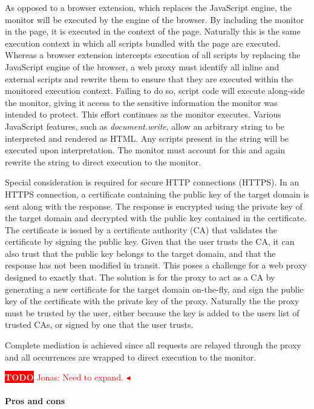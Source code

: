 \documentclass{llncs}
\newcommand{\todo}[1]{\colorbox{red}{\textcolor{white}{\sffamily\bfseries\scriptsize TODO}} \textcolor{red}{#1} \textcolor{red}{$\blacktriangleleft$}}
\begin{document}
As opposed to a browser extension, which replaces the 
JavaScript engine, the monitor will be executed by the engine of the browser. 
By including the monitor in the page, it is executed in the context of the page. Naturally 
this is the same execution context in which all scripts bundled with the 
page are executed. Whereas a 
browser extension intercepts execution of all scripts by replacing the JavaScript 
engine of the browser, a web proxy must identify all inline and 
external scripts and rewrite them to ensure that they are executed within the 
monitored execution context. Failing to do so, script code will execute 
along-side the monitor, giving it access to the sensitive information the 
monitor was intended to protect. 
This effort continues as the monitor executes. Various JavaScript features, such as 
\emph{document.write}, allow an arbitrary string to be 
interpreted and rendered as HTML. Any scripts present in the string will be 
executed upon interpretation. The monitor must account for this and again rewrite 
the string to direct execution to the monitor.

Special consideration is required for secure HTTP connections (HTTPS). In an HTTPS 
connection, a certificate containing the public key of the target domain is sent 
along with the response. The response is encrypted using the private key of the target 
domain and decrypted with the public key contained in the certificate. The 
certificate is issued by a certificate authority (CA)
that validates the certificate by signing the public key. Given that the user 
trusts the CA, it can also trust that the public key belongs 
to the target domain, and that the response has not been modified in transit.
This poses a challenge for a web proxy designed to exactly that. The solution 
is for the proxy to act as a CA by generating a
new certificate for the target domain on-the-fly, and sign the 
public key of the certificate with the private key of the proxy. Naturally the 
the proxy must be trusted by the user, either because the key is added to 
the users list of trusted CAs, or signed by one that the user trusts.

Complete mediation is achieved since all requests are relayed through the proxy 
and all occurrences are wrapped to direct execution to the monitor.

\todo{Jonas: Need to expand.}

\paragraph{Pros and cons}
\end{document}
